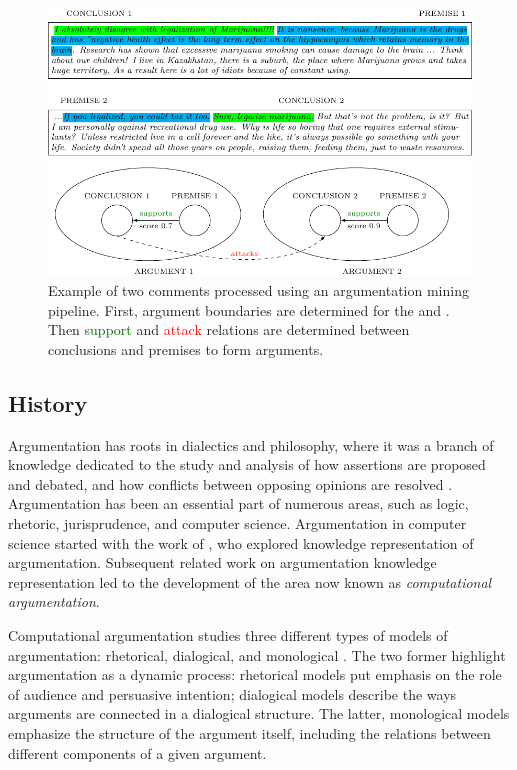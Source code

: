\begin{figure}[t!]
	\centering
	\includegraphics{area_description_example-figure0.pdf}
\caption{Example of two comments processed using an argumentation mining pipeline. 
	First, argument boundaries are determined for the  and 
	. Then \textcolor{darkgreen}{support} and 
	\textcolor{red}{attack} relations are
	determined between conclusions and premises
	to form arguments.
	}
	\label{fig:example_pipeline}
\end{figure}

\subsection{History}

Argumentation has roots in dialectics and philosophy, where it was a branch of
knowledge dedicated to the study and analysis of how assertions are proposed
and debated, and how conflicts between opposing opinions are resolved
\citep{bench2007argumentation}.  Argumentation has been an essential part of
numerous areas, such as logic, rhetoric, jurisprudence, and computer science. 
Argumentation in computer science started with 
the work of \citep{dung1995acceptability}, who explored knowledge representation
of argumentation. Subsequent related work on argumentation
knowledge representation led to the development of 
the area now known as \emph{computational argumentation}. 

Computational argumentation studies three different types of models of argumentation:
rhetorical, dialogical, and monological \citep{bentahar2010taxonomy}. 
The two former highlight argumentation as a dynamic process: rhetorical models
put emphasis on the role of audience and persuasive intention; dialogical 
models describe the ways arguments are connected in a dialogical structure. 
The latter, monological models emphasize the structure of the argument itself, 
including the relations between different components of a given argument. 

